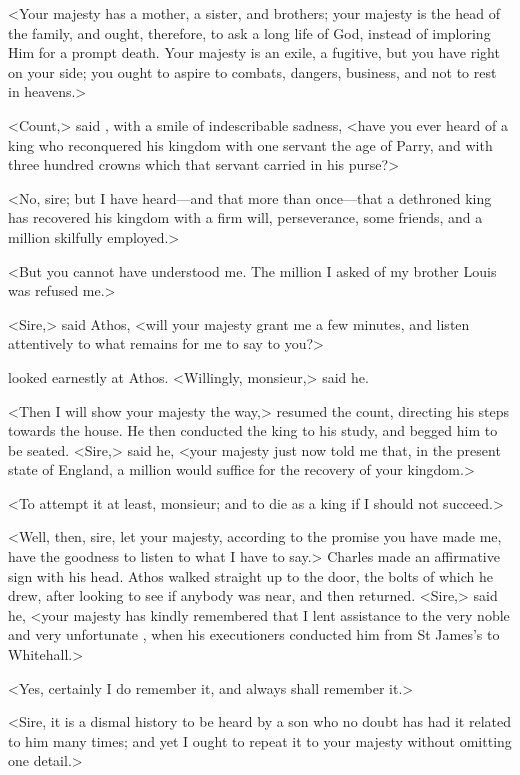<Your majesty has a mother, a sister, and brothers; your majesty is the head of the family, and ought, therefore, to ask a long life of God, instead of imploring Him for a prompt death. Your majesty is an exile, a fugitive, but you have right on your side; you ought to aspire to combats, dangers, business, and not to rest in heavens.>

<Count,> said , with a smile of indescribable sadness, <have you ever heard of a king who reconquered his kingdom with one servant the age of Parry, and with three hundred crowns which that servant carried in his purse?>

<No, sire; but I have heard—and that more than once—that a dethroned king has recovered his kingdom with a firm will, perseverance, some friends, and a million skilfully employed.>

<But you cannot have understood me. The million I asked of my brother Louis was refused me.>

<Sire,> said Athos, <will your majesty grant me a few minutes, and listen attentively to what remains for me to say to you?>

 looked earnestly at Athos. <Willingly, monsieur,> said he.

<Then I will show your majesty the way,> resumed the count, directing his steps towards the house. He then conducted the king to his study, and begged him to be seated. <Sire,> said he, <your majesty just now told me that, in the present state of England, a million would suffice for the recovery of your kingdom.>

<To attempt it at least, monsieur; and to die as a king if I should not succeed.>

<Well, then, sire, let your majesty, according to the promise you have made me, have the goodness to listen to what I have to say.> Charles made an affirmative sign with his head. Athos walked straight up to the door, the bolts of which he drew, after looking to see if anybody was near, and then returned. <Sire,> said he, <your majesty has kindly remembered that I lent assistance to the very noble and very unfortunate , when his executioners conducted him from St James's to Whitehall.>

<Yes, certainly I do remember it, and always shall remember it.>

<Sire, it is a dismal history to be heard by a son who no doubt has had it related to him many times; and yet I ought to repeat it to your majesty without omitting one detail.>

